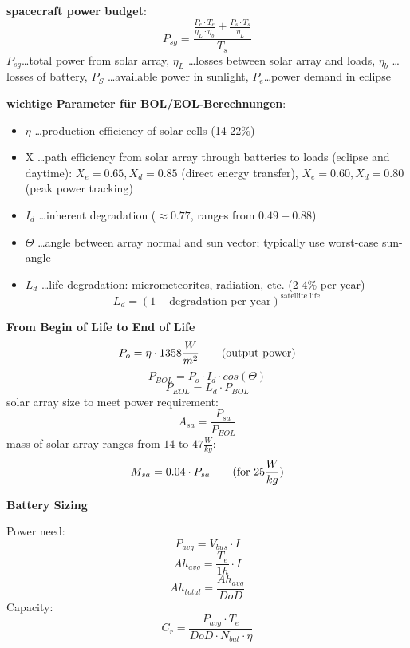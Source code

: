 \documentclass[a4paper,10pt]{article}
\newcommand{\f}{\textbf}
\begin{document}
\noindent \f{spacecraft power budget}:
\[P_{sg} = \frac{\frac{P_e\cdot T_e}{\eta_L\cdot \eta_b}+ \frac{P_s\cdot T_s}{\eta_L}}{T_s}\]
$P_{sg}$\dots total power from solar array, $\eta_L$ \dots losses between solar array and loads, $\eta_b$ \dots losses of battery, $P_S$ \dots available power in sunlight, $P_e$\dots power demand in 
eclipse\\
\vspace*{3pt}

\noindent \f{wichtige Parameter für BOL/EOL-Berechnungen}:
\begin{itemize}
 \item $\eta$ \dots production efficiency of solar cells (14-22\%)
 \item X \dots path efficiency from solar array through batteries to loads (eclipse and daytime): $X_e=0.65, X_d=0.85$ (direct energy transfer), $X_e=0.60, X_d=0.80$ (peak power tracking)
 \item $I_d$ \dots inherent degradation ($\approx 0.77$, ranges from $0.49-0.88$)
 \item $\Theta$ \dots angle between array normal and sun vector; typically use worst-case sun-angle
 \item $L_d$ \dots life degradation: micrometeorites, radiation, etc. (2-4\% per year)\[L_d = (1-\text{degradation per year})^{\text{satellite life}}\]
\end{itemize}

\vspace*{5pt}

\noindent \f{From Begin of Life to End of Life}
\[P_{o} = \eta\cdot 1358\frac{W}{m^2} \text{\qquad (output power)}\]
\[P_{BOL} = P_o\cdot I_d\cdot cos(\Theta)\]
\[P_{EOL} = L_d\cdot P_{BOL}\]
solar array size to meet power requirement:
\[A_{sa} = \frac{P_{sa}}{P_{EOL}}\]
mass of solar array ranges from $14$ to $47 \frac{W}{kg}$:
\[M_{sa} = 0.04\cdot P_{sa} \text{\qquad (for } 25 \frac{W}{kg})\]

\noindent \f{Battery Sizing}\\
\vspace*{3pt}

\noindent Power need:
\[P_{avg} = V_{bus}\cdot I\]
\[Ah_{avg} = \frac{T_e}{1h}\cdot I\]
\[Ah_{total} = \frac{Ah_{avg}}{DoD}\]
Capacity:
\[C_r = \frac{P_{avg}\cdot T_e}{DoD\cdot N_{bat} \cdot \eta}\]
\end{document}
